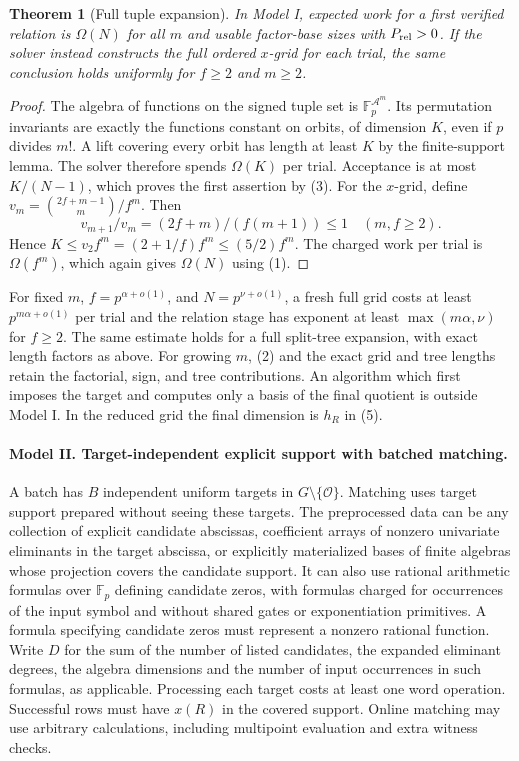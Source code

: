 \documentclass[11pt]{article}
\newtheorem{theorem}{Theorem}
\newcommand{\Fp}{\mathbb F_p}
\newcommand{\OO}{\mathcal O}
\newcommand{\A}{\mathcal A}
\begin{document}
\begin{theorem}[Full tuple expansion]
In Model I, expected work for a first verified relation is \(\Omega(N)\) for all \(m\) and usable factor-base sizes with \(P_{\rm rel}>0\). If the solver instead constructs the full ordered \(x\)-grid for each trial, the same conclusion holds uniformly for \(f\ge2\) and \(m\ge2\).
\end{theorem}
\begin{proof}
The algebra of functions on the signed tuple set is \(\Fp^{\A^m}\). Its permutation invariants are exactly the functions constant on orbits, of dimension \(K\), even if \(p\) divides \(m!\). A lift covering every orbit has length at least \(K\) by the finite-support lemma. The solver therefore spends \(\Omega(K)\) per trial. Acceptance is at most \(K/(N-1)\), which proves the first assertion by (3). For the \(x\)-grid, define \(v_m=\binom{2f+m-1}{m}/f^m\). Then
\[
  v_{m+1}/v_m=(2f+m)/(f(m+1))\le1\quad(m,f\ge2).
\]
Hence \(K\le v_2 f^m=(2+1/f)f^m\le(5/2)f^m\). The charged work per trial is \(\Omega(f^m)\), which again gives \(\Omega(N)\) using (1).
\end{proof}

For fixed \(m\), \(f=p^{\alpha+o(1)}\), and \(N=p^{\nu+o(1)}\), a fresh full grid costs at least \(p^{m\alpha+o(1)}\) per trial and the relation stage has exponent at least \(\max(m\alpha,\nu)\) for \(f\ge2\). The same estimate holds for a full split-tree expansion, with exact length factors as above. For growing \(m\), (2) and the exact grid and tree lengths retain the factorial, sign, and tree contributions. An algorithm which first imposes the target and computes only a basis of the final quotient is outside Model I. In the reduced grid the final dimension is \(h_R\) in (5).

\paragraph{Model II. Target-independent explicit support with batched matching.}
A batch has \(B\) independent uniform targets in \(G\setminus\{\OO\}\). Matching uses target support prepared without seeing these targets. The preprocessed data can be any collection of explicit candidate abscissas, coefficient arrays of nonzero univariate eliminants in the target abscissa, or explicitly materialized bases of finite algebras whose projection covers the candidate support. It can also use rational arithmetic formulas over \(\Fp\) defining candidate zeros, with formulas charged for occurrences of the input symbol and without shared gates or exponentiation primitives. A formula specifying candidate zeros must represent a nonzero rational function. Write \(D\) for the sum of the number of listed candidates, the expanded eliminant degrees, the algebra dimensions and the number of input occurrences in such formulas, as applicable. Processing each target costs at least one word operation. Successful rows must have \(x(R)\) in the covered support. Online matching may use arbitrary calculations, including multipoint evaluation and extra witness checks.
\end{document}
